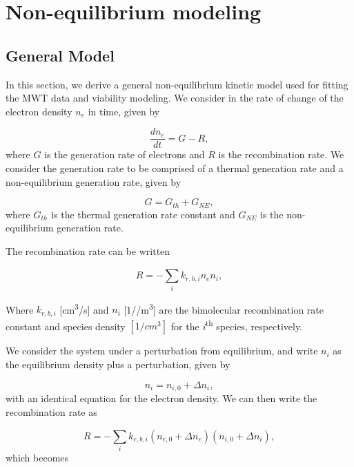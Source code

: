 \section{Non-equilibrium modeling}

\subsection{General Model}

In this section, we derive a general non-equilibrium kinetic model used for fitting the MWT data and viability modeling. We consider in the rate of change of the electron density \(n_{e}\) in time, given by

\begin{equation}
  \label{eq:start_deqn}
\frac{dn_{e}}{dt} = G - R,
\end{equation}
where \(G\) is the generation rate of electrons and \(R\) is the recombination rate. We consider the generation rate to be comprised of a thermal generation rate and a non-equilibrium generation rate, given by

\begin{equation}
  G = G_{th} + G_{NE},
\end{equation}
where \(G_{th}\) is the thermal generation rate constant and \(G_{NE}\) is the non-equilibrium generation rate. 

The recombination rate can be written

\begin{equation}
  R = - \sum_{i}^{}k_{r, b, i}n_{e}n_{i},
\end{equation}

Where $k_{r, b, i}$ [\unit{\centi\meter^3/\second}] and $n_i$ [\unit{1/\centi/\meter^3}] are the bimolecular recombination rate constant and species density $[1/cm^3]$ for the \emph{i}\textsuperscript{th} species, respectively. 

We consider the system under a perturbation from equilibrium, and write $n_i$ as the equilibrium density plus a perturbation, given by

\begin{equation}
  n_{i} = n_{i,0} + \Delta n_{i},
\end{equation}
with an identical equation for the electron density. We can then write the recombination rate as

\begin{equation}
  R = - \sum_{i}^{}k_{r, b, i}(n_{e,0} + \Delta n_{e})(n_{i,0} + \Delta n_{i}),
\end{equation}
which becomes

